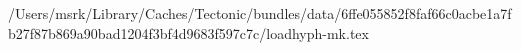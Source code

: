 /Users/msrk/Library/Caches/Tectonic/bundles/data/6ffe055852f8faf66c0acbe1a7fb27f87b869a90bad1204f3bf4d9683f597c7c/loadhyph-mk.tex